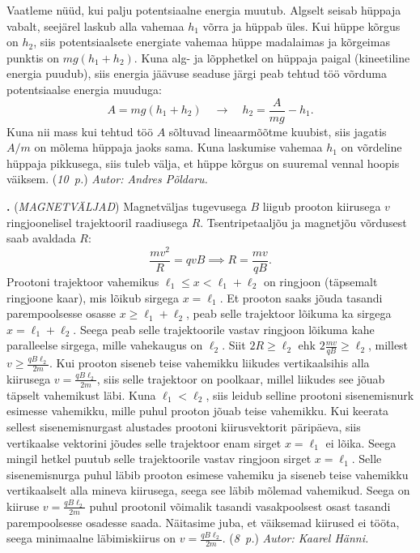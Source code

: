\documentclass[12pt,a5paper]{article}
\newcommand{\numb}[1]{\vspace{5pt}\textbf{\large #1}}
\newcommand{\nimi}[1]{(\textsl{\small #1})}
\newcommand{\punktid}[1]{(\emph{#1~p.})}
\newcommand{\autor}[1]{\emph{ Autor: #1.}}
\newcounter{ylesanne}
\newcommand{\yl}[1]{\addtocounter{ylesanne}{1}\numb{\theylesanne.} \nimi{#1} \newblock{}}
\begin{document}
Vaatleme nüüd, kui palju potentsiaalne energia muutub. Algselt seisab hüppaja vabalt, seejärel laskub alla vahemaa $h_1$ võrra ja hüppab üles. Kui hüppe kõrgus on $h_2$, siis potentsiaalsete energiate vahemaa hüppe madalaimas ja kõrgeimas punktis on $mg(h_1+h_2)$. Kuna alg- ja lõpphetkel on hüppaja paigal (kineetiline energia puudub), siis energia jäävuse seaduse järgi peab tehtud töö võrduma potentsiaalse energia muuduga:
$$A = mg(h_1+h_2) \quad\rightarrow\quad h_2 = \frac{A}{mg} - h_1.$$
Kuna nii mass kui tehtud töö $A$ sõltuvad lineaarmõõtme kuubist, siis jagatis $A/m$ on mõlema hüppaja jaoks sama. Kuna laskumise vahemaa $h_1$ on võrdeline hüppaja pikkusega, siis tuleb välja, et hüppe kõrgus on suuremal vennal hoopis väiksem.
\punktid{10}\autor{Andres Põldaru}



\yl{MAGNETVÄLJAD}
Magnetväljas tugevusega $B$ liigub prooton kiirusega $v$ ringjoonelisel trajektooril raadiusega $R$. Tsentripetaaljõu ja magnetjõu võrdusest saab avaldada $R$:
\[\frac{mv^2}{R}=qvB\implies R=\frac{mv}{qB}.\]
Prootoni trajektoor vahemikus $\ell_1\leq x < \ell_1+\ell_2$ on ringjoon (täpsemalt ringjoone kaar), mis lõikub sirgega $x=\ell_1$. Et prooton saaks jõuda tasandi parempoolsesse osasse $x\geq \ell_1+\ell_2$, peab selle trajektoor lõikuma ka sirgega $x=\ell_1+\ell_2$. Seega peab selle trajektoorile vastav ringjoon lõikuma kahe paralleelse sirgega, mille vahekaugus on $\ell_2$. Siit $2R \geq \ell_2$ ehk $2\frac{mv}{qB}\geq \ell_2$, millest $v\geq \frac{qB\ell_2}{2m}$. Kui prooton siseneb teise vahemikku liikudes vertikaalsihis alla kiirusega $v= \frac{qB\ell_2}{2m}$, siis selle trajektoor on poolkaar, millel liikudes see jõuab täpselt vahemikust läbi. Kuna $\ell_1<\ell_2$, siis leidub selline prootoni sisenemisnurk esimesse vahemikku, mille puhul prooton jõuab teise vahemikku. Kui keerata sellest sisenemisnurgast alustades prootoni kiirusvektorit päripäeva, siis vertikaalse vektorini jõudes selle trajektoor enam sirget $x=\ell_1$ ei lõika. Seega mingil hetkel puutub selle trajektoorile vastav ringjoon sirget $x=\ell_1$. Selle sisenemisnurga puhul läbib prooton esimese vahemiku ja siseneb teise vahemikku vertikaalselt alla mineva kiirusega, seega see läbib mõlemad vahemikud. Seega on kiiruse $v=\frac{qB\ell_2}{2m}$ puhul prootonil võimalik tasandi vasakpoolsest osast tasandi parempoolsesse osadesse saada. Näitasime juba, et väiksemad kiirused ei tööta, seega minimaalne läbimiskiirus on $v=\frac{qB\ell_2}{2m}$.
\punktid{8}\autor{Kaarel Hänni}
\end{document}
